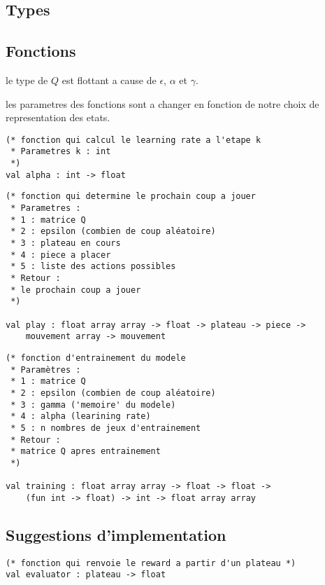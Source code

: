 \documentclass{article}
\begin{document}
\subsection{Types}

\subsection{Fonctions}

\danger{} le type de \( Q \) est flottant a cause de \( \epsilon \), \( \alpha \) et \( \gamma \).

\noindent
\danger{} les parametres des fonctions sont a changer en fonction de notre
choix de representation des etats.

\begin{lstlisting}[frame=L]
(* fonction qui calcul le learning rate a l'etape k
 * Parametres k : int
 *)
val alpha : int -> float
\end{lstlisting}


\begin{lstlisting}[frame=L]
(* fonction qui determine le prochain coup a jouer
 * Parametres :
 * 1 : matrice Q
 * 2 : epsilon (combien de coup aléatoire)
 * 3 : plateau en cours
 * 4 : piece a placer
 * 5 : liste des actions possibles
 * Retour :
 * le prochain coup a jouer
 *)

val play : float array array -> float -> plateau -> piece ->
	mouvement array -> mouvement
\end{lstlisting}

\begin{lstlisting}[frame=L]
(* fonction d'entrainement du modele
 * Paramètres :
 * 1 : matrice Q
 * 2 : epsilon (combien de coup aléatoire)
 * 3 : gamma ('memoire' du modele)
 * 4 : alpha (learining rate)
 * 5 : n nombres de jeux d'entrainement
 * Retour :
 * matrice Q apres entrainement
 *)

val training : float array array -> float -> float ->
	(fun int -> float) -> int -> float array array
\end{lstlisting}

\subsection{Suggestions d'implementation}

\begin{lstlisting}[frame=L]
(* fonction qui renvoie le reward a partir d'un plateau *)
val evaluator : plateau -> float
\end{lstlisting}
\end{document}
